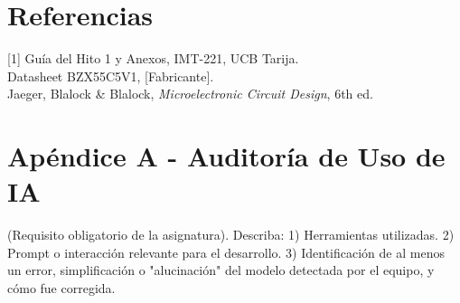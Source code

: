 \documentclass[10pt, a4paper, twocolumn]{article}
\begin{document}
\section*{Referencias}
[1] Guía del Hito 1 y Anexos, IMT-221, UCB Tarija. \\
\relax [2] Datasheet BZX55C5V1, [Fabricante]. \\
\relax [3] Jaeger, Blalock \& Blalock, \textit{Microelectronic Circuit Design}, 6th ed.

\section*{Apéndice A - Auditoría de Uso de IA}
(Requisito obligatorio de la asignatura). Describa:
1) Herramientas utilizadas.
2) Prompt o interacción relevante para el desarrollo.
3) Identificación de al menos un error, simplificación o "alucinación" del modelo detectada por el equipo, y cómo fue corregida.
\end{document}

